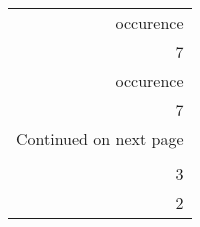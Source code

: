 \begin{longtable}{r}
\toprule
 occurence \\
         7 \\
\midrule
\endfirsthead

\toprule
 occurence \\
         7 \\
\midrule
\endhead
\midrule
\multicolumn{1}{r}{{Continued on next page}} \\
\midrule
\endfoot

\bottomrule
\endlastfoot
         5 \\
         3 \\
         2 \\
\end{longtable}

